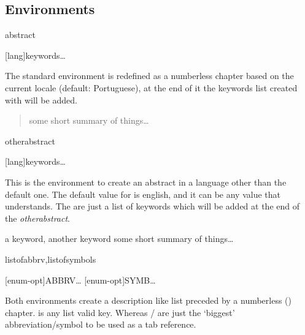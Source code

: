 \documentclass[article,nogeometry,english,tocdepth=3,secdepth=3]{ufrgscca} %
\begin{document}
\subsection{Environments}

\begin{codedescribe}[env]{abstract}
	\begin{codesyntax}%
		\tsmacro{\begin{abstract}}[lang]{keywords}\ldots\tsmacro{\end{abstract}}{}
	\end{codesyntax}
	The standard environment  is redefined as a numberless chapter based on the current locale (default: Portuguese), at the end of it the keywords list created with \tsmacro{\keyword}{} will be added.
\end{codedescribe}

\begin{codestore}[st=d.abstract]
	\keyword{a keyword}
	\keyword{another keyword}
	\begin{abstract} some short summary of things\ldots
	\end{abstract}
\end{codestore}

\begin{codedescribe}[env]{otherabstract}
	\begin{codesyntax}%
		\tsmacro{\begin{otherabstract}}[lang]{keywords}\ldots\tsmacro{\end{otherabstract}}{}
	\end{codesyntax}
This is the environment to create an abstract in a language other than the default one.
The default value for  is english, and it can be any value that  understands. The  are just a list of keywords which will be added at the end of the \emph{otherabstract}.
\end{codedescribe}

\begin{codestore}[st=d.oabstract]
	\begin{otherabstract}[english]{a keyword, another keyword} some short summary of things\ldots
	\end{otherabstract}
\end{codestore}


\begin{codedescribe}[env]{listofabbrv,listofsymbols}
	\begin{codesyntax}%
	\tsmacro{\begin{listofabbrv}}[enum-opt]{ABBRV}\ldots\tsmacro{\end{listofabbrv}}{}
	\tsmacro{\begin{listofsymbols}}[enum-opt]{SYMB}\ldots\tsmacro{\end{listofsymbols}}{}
	\end{codesyntax}
\end{codedescribe}
Both environments create a description like list preceded by a numberless (\tsmacro{\nonum}{}) chapter.  is any  list valid key. Whereas  /  are just the `biggest' abbreviation/symbol to be used as a tab reference.
\end{document}

